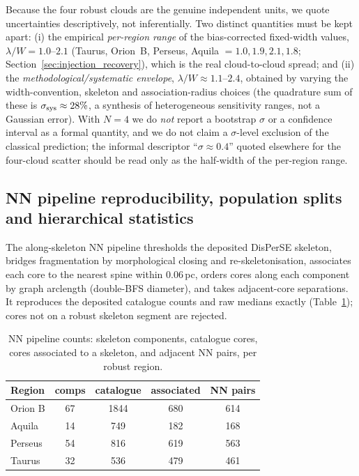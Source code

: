 \documentclass[usenatbib,twoside,twocolumn]{mnras}
\begin{document}
Because the four robust clouds are the genuine independent units, we quote uncertainties descriptively, not inferentially. Two distinct quantities must be kept apart: (i) the empirical \emph{per-region range} of the bias-corrected fixed-width values, $\lambda/W=1.0$--$2.1$ (Taurus, Orion~B, Perseus, Aquila $=1.0,1.9,2.1,1.8$; Section~\ref{sec:injection_recovery}), which is the real cloud-to-cloud spread; and (ii) the \emph{methodological/systematic envelope}, $\lambda/W\approx1.1$--$2.4$, obtained by varying the width-convention, skeleton and association-radius choices (the quadrature sum of these is $\sigma_{\rm sys}\approx28\%$, a synthesis of heterogeneous sensitivity ranges, not a Gaussian error). With $N=4$ we do \emph{not} report a bootstrap $\sigma$ or a confidence interval as a formal quantity, and we do not claim a $\sigma$-level exclusion of the classical prediction; the informal descriptor ``$\sigma\approx0.4$'' quoted elsewhere for the four-cloud scatter should be read only as the half-width of the per-region range.

\subsection{NN pipeline reproducibility, population splits and hierarchical statistics}
\label{sec:nnpipeline}

The along-skeleton NN pipeline thresholds the deposited DisPerSE skeleton, bridges fragmentation by morphological closing and re-skeletonisation, associates each core to the nearest spine within $0.06$\,pc, orders cores along each component by graph arclength (double-BFS diameter), and takes adjacent-core separations. It reproduces the deposited catalogue counts and raw medians exactly (Table~\ref{tab:nnpipeline}); cores not on a robust skeleton segment are rejected.

\begin{table}
\caption{NN pipeline counts: skeleton components, catalogue cores, cores associated to a skeleton, and adjacent NN pairs, per robust region.}
\label{tab:nnpipeline}
\footnotesize
\setlength{\tabcolsep}{4pt}
\begin{tabular}{lcccc}
\toprule
Region & comps & catalogue & associated & NN pairs \\
\midrule
Orion B & 67 & 1844 & 680 & 614 \\
Aquila  & 14 & 749  & 182 & 168 \\
Perseus & 54 & 816  & 619 & 563 \\
Taurus  & 32 & 536  & 479 & 461 \\
\bottomrule
\end{tabular}
\end{table}
\end{document}

